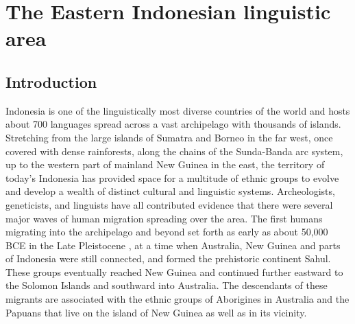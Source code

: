 \chapter{The Eastern Indonesian linguistic area}\label{ch:area}

\section{Introduction} \label{sec:area_intro}
Indonesia is one of the linguistically most diverse countries of the world and hosts about 700 languages spread across a vast archipelago with thousands of islands. Stretching from the large islands of Sumatra and Borneo in the far west, once covered with dense rainforests, along the chains of the Sunda-Banda arc system, up to the western part of mainland New Guinea in the east, the territory of today's Indonesia has provided space for a multitude of ethnic groups to evolve and develop a wealth of distinct cultural and linguistic systems. Archeologists, geneticists, and linguists have all contributed evidence that there were several major waves of human migration spreading over the area. The first humans migrating into the archipelago and beyond set forth as early as about 50,000 BCE in the Late Pleistocene \citep{capelli2001}, at a time when Australia, New Guinea and parts of Indonesia were still connected, and formed the prehistoric continent Sahul. These groups eventually reached New Guinea and continued further eastward to the Solomon Islands and southward into Australia. The descendants of these migrants are associated with the ethnic groups of Aborigines in Australia and the Papuans that live on the island of New Guinea as well as in its vicinity. 

